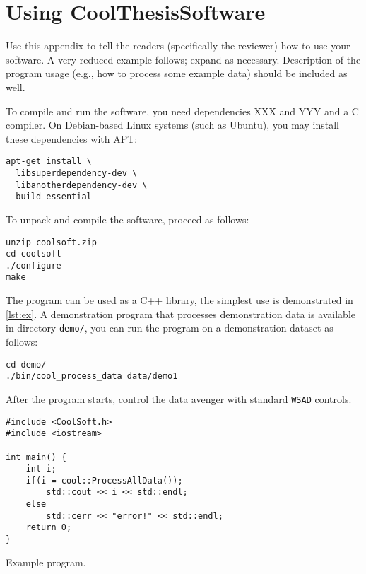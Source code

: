 \chapter{Using CoolThesisSoftware}

Use this appendix to tell the readers (specifically the reviewer) how to use your software. A very reduced example follows; expand as necessary. Description of the program usage (e.g., how to process some example data) should be included as well.

To compile and run the software, you need dependencies XXX and YYY and a C compiler. On Debian-based Linux systems (such as Ubuntu), you may install these dependencies with APT:
\begin{Verbatim}
apt-get install \
  libsuperdependency-dev \
  libanotherdependency-dev \
  build-essential
\end{Verbatim}

To unpack and compile the software, proceed as follows:
\begin{Verbatim}
unzip coolsoft.zip
cd coolsoft
./configure
make
\end{Verbatim}

The program can be used as a C++ library, the simplest use is demonstrated in \cref{lst:ex}. A demonstration program that processes demonstration data is available in directory \verb|demo/|, you can run the program on a demonstration dataset as follows:
\begin{Verbatim}
cd demo/
./bin/cool_process_data data/demo1
\end{Verbatim}

After the program starts, control the data avenger with standard \verb-WSAD- controls.

\begin{listing}
\begin{lstlisting}
#include <CoolSoft.h>
#include <iostream>

int main() {
	int i;
	if(i = cool::ProcessAllData());
		std::cout << i << std::endl;
	else
		std::cerr << "error!" << std::endl;
	return 0;
}
\end{lstlisting}
\caption{Example program.}
\label{lst:ex}
\end{listing}
